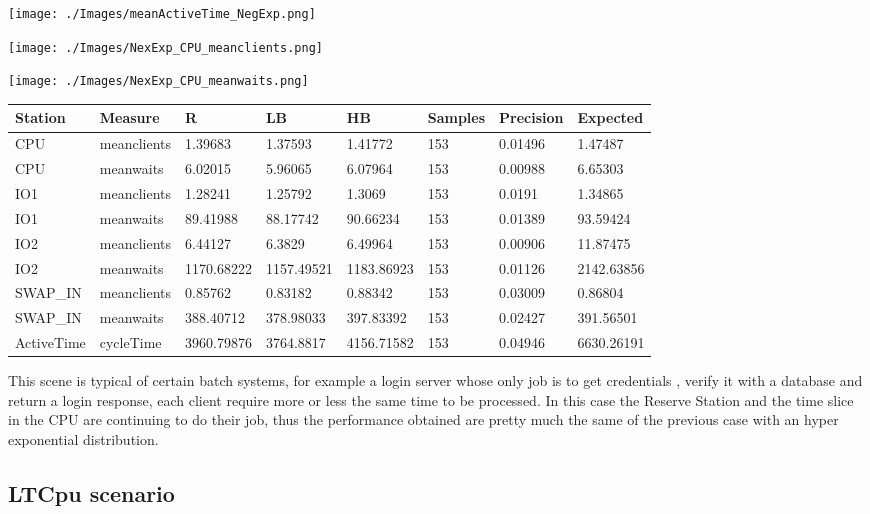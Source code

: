 \documentclass[12pt,a4paper]{article}
\begin{document}
\texttt{[image: ./Images/meanActiveTime\_NegExp.png]}

\texttt{[image: ./Images/NexExp\_CPU\_meanclients.png]}

\texttt{[image: ./Images/NexExp\_CPU\_meanwaits.png]}


\begin{table}[!ht]
    \centering
    \begin{tabular}{|l|l|l|l|l|l|l|l|}
    \hline
        Station & Measure & R & LB & HB & Samples & Precision & Expected \\ \hline
        CPU & meanclients & 1.39683 & 1.37593 & 1.41772 & 153 & 0.01496 & 1.47487 \\ \hline
        CPU & meanwaits & 6.02015 & 5.96065 & 6.07964 & 153 & 0.00988 & 6.65303 \\ \hline
        IO1 & meanclients & 1.28241 & 1.25792 & 1.3069 & 153 & 0.0191 & 1.34865 \\ \hline
        IO1 & meanwaits & 89.41988 & 88.17742 & 90.66234 & 153 & 0.01389 & 93.59424 \\ \hline
        IO2 & meanclients & 6.44127 & 6.3829 & 6.49964 & 153 & 0.00906 & 11.87475 \\ \hline
        IO2 & meanwaits & 1170.68222 & 1157.49521 & 1183.86923 & 153 & 0.01126 & 2142.63856 \\ \hline
        SWAP\_IN & meanclients & 0.85762 & 0.83182 & 0.88342 & 153 & 0.03009 & 0.86804 \\ \hline
        SWAP\_IN & meanwaits & 388.40712 & 378.98033 & 397.83392 & 153 & 0.02427 & 391.56501 \\ \hline
        ActiveTime & cycleTime & 3960.79876 & 3764.8817 & 4156.71582 & 153 & 0.04946 & 6630.26191 \\ \hline
    \end{tabular}
\end{table}

This scene is typical of certain batch systems, for example a login server whose only job is to get credentials , verify it with a database and return a login response, each client require more or less the same time to be processed. In this case the Reserve Station and the time slice in the CPU are continuing to do their job, thus the performance obtained are pretty much the same of the previous case with an hyper exponential distribution.


\subsection{LTCpu scenario}
\end{document}

